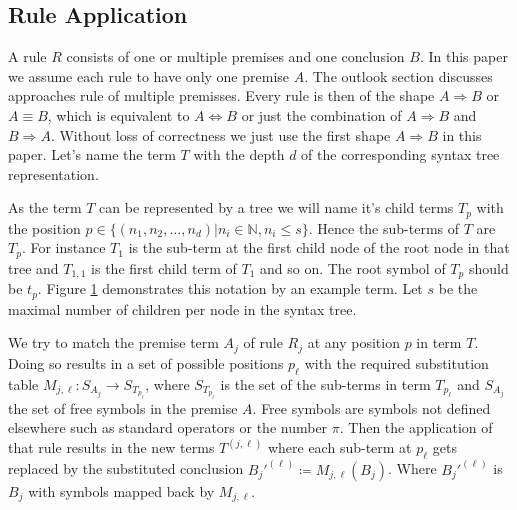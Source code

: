 \documentclass{scrartcl}
\theoremstyle{definition}
\begin{document}
\subsection{Rule Application}

A rule $R$ consists of one or multiple premises and one conclusion $B$.
In this paper we assume each rule to have only one premise $A$.
The outlook section discusses approaches rule of multiple premisses. 
Every rule is then of the shape $A \Longrightarrow B$ or $A \equiv B$, which is equivalent to $A \Longleftrightarrow B$ or just the combination of $A \Longrightarrow B$ and $B \Longrightarrow A$.
Without loss of correctness we just use the first shape $A \Longrightarrow B$ in this paper.
Let's name the term $T$ with the depth $d$ of the corresponding syntax tree representation.

\begin{figure}[!htbp]
	\centering
	
	\label{fig:sxntax_tree}
\end{figure}

As the term $T$ can be represented by a tree we will name it's child terms $T_p$ with the position $p \in \big\{\left( n_1, n_2, \dots, n_d \right) | n_i \in \mathbb{N}, n_i \leq s \big\}$.
Hence the sub-terms of $T$ are $T_p$.
For instance $T_1$ is the sub-term at the first child node of the root node in that tree and $T_{1,1}$ is the first child term of $T_1$ and so on.
The root symbol of $T_p$ should be $t_p$.
Figure \ref{fig:sxntax_tree} demonstrates this notation by an example term.
Let $s$ be the maximal number of children per node in the syntax tree.

We try to match the premise term $A_j$ of rule $R_j$ at any position $p$ in term $T$.
Doing so results in a set of possible positions $p_\ell$ with the required substitution table ${M_{j,\ell}: S_{A_j} \to S_{T_{p_\ell}}}$,
where $S_{T_{p_\ell}}$ is the set of the sub-terms in term $T_{p_\ell}$ and $S_{A_j}$ the set of free symbols in the premise $A$.
Free symbols are symbols not defined elsewhere such as standard operators or the number $\pi$.
Then the application of that rule results in the new terms $T^{(j,\ell)}$ where each sub-term at $p_\ell$ gets replaced by the substituted conclusion ${B_j'^{(\ell)} \coloneqq M_{j,\ell}\left( B_j \right)}$.
Where $B_j'^{(\ell)}$ is $B_j$ with symbols mapped back by $M_{j,\ell}$. 
\end{document}
